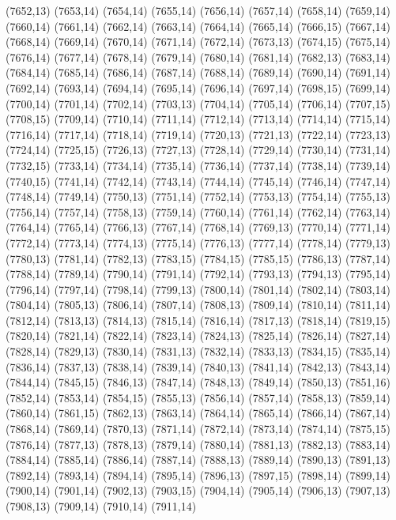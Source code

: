 (7652,13)
(7653,14)
(7654,14)
(7655,14)
(7656,14)
(7657,14)
(7658,14)
(7659,14)
(7660,14)
(7661,14)
(7662,14)
(7663,14)
(7664,14)
(7665,14)
(7666,15)
(7667,14)
(7668,14)
(7669,14)
(7670,14)
(7671,14)
(7672,14)
(7673,13)
(7674,15)
(7675,14)
(7676,14)
(7677,14)
(7678,14)
(7679,14)
(7680,14)
(7681,14)
(7682,13)
(7683,14)
(7684,14)
(7685,14)
(7686,14)
(7687,14)
(7688,14)
(7689,14)
(7690,14)
(7691,14)
(7692,14)
(7693,14)
(7694,14)
(7695,14)
(7696,14)
(7697,14)
(7698,15)
(7699,14)
(7700,14)
(7701,14)
(7702,14)
(7703,13)
(7704,14)
(7705,14)
(7706,14)
(7707,15)
(7708,15)
(7709,14)
(7710,14)
(7711,14)
(7712,14)
(7713,14)
(7714,14)
(7715,14)
(7716,14)
(7717,14)
(7718,14)
(7719,14)
(7720,13)
(7721,13)
(7722,14)
(7723,13)
(7724,14)
(7725,15)
(7726,13)
(7727,13)
(7728,14)
(7729,14)
(7730,14)
(7731,14)
(7732,15)
(7733,14)
(7734,14)
(7735,14)
(7736,14)
(7737,14)
(7738,14)
(7739,14)
(7740,15)
(7741,14)
(7742,14)
(7743,14)
(7744,14)
(7745,14)
(7746,14)
(7747,14)
(7748,14)
(7749,14)
(7750,13)
(7751,14)
(7752,14)
(7753,13)
(7754,14)
(7755,13)
(7756,14)
(7757,14)
(7758,13)
(7759,14)
(7760,14)
(7761,14)
(7762,14)
(7763,14)
(7764,14)
(7765,14)
(7766,13)
(7767,14)
(7768,14)
(7769,13)
(7770,14)
(7771,14)
(7772,14)
(7773,14)
(7774,13)
(7775,14)
(7776,13)
(7777,14)
(7778,14)
(7779,13)
(7780,13)
(7781,14)
(7782,13)
(7783,15)
(7784,15)
(7785,15)
(7786,13)
(7787,14)
(7788,14)
(7789,14)
(7790,14)
(7791,14)
(7792,14)
(7793,13)
(7794,13)
(7795,14)
(7796,14)
(7797,14)
(7798,14)
(7799,13)
(7800,14)
(7801,14)
(7802,14)
(7803,14)
(7804,14)
(7805,13)
(7806,14)
(7807,14)
(7808,13)
(7809,14)
(7810,14)
(7811,14)
(7812,14)
(7813,13)
(7814,13)
(7815,14)
(7816,14)
(7817,13)
(7818,14)
(7819,15)
(7820,14)
(7821,14)
(7822,14)
(7823,14)
(7824,13)
(7825,14)
(7826,14)
(7827,14)
(7828,14)
(7829,13)
(7830,14)
(7831,13)
(7832,14)
(7833,13)
(7834,15)
(7835,14)
(7836,14)
(7837,13)
(7838,14)
(7839,14)
(7840,13)
(7841,14)
(7842,13)
(7843,14)
(7844,14)
(7845,15)
(7846,13)
(7847,14)
(7848,13)
(7849,14)
(7850,13)
(7851,16)
(7852,14)
(7853,14)
(7854,15)
(7855,13)
(7856,14)
(7857,14)
(7858,13)
(7859,14)
(7860,14)
(7861,15)
(7862,13)
(7863,14)
(7864,14)
(7865,14)
(7866,14)
(7867,14)
(7868,14)
(7869,14)
(7870,13)
(7871,14)
(7872,14)
(7873,14)
(7874,14)
(7875,15)
(7876,14)
(7877,13)
(7878,13)
(7879,14)
(7880,14)
(7881,13)
(7882,13)
(7883,14)
(7884,14)
(7885,14)
(7886,14)
(7887,14)
(7888,13)
(7889,14)
(7890,13)
(7891,13)
(7892,14)
(7893,14)
(7894,14)
(7895,14)
(7896,13)
(7897,15)
(7898,14)
(7899,14)
(7900,14)
(7901,14)
(7902,13)
(7903,15)
(7904,14)
(7905,14)
(7906,13)
(7907,13)
(7908,13)
(7909,14)
(7910,14)
(7911,14)
